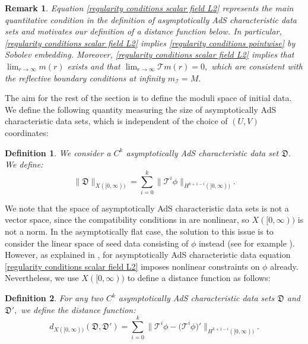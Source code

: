 \documentclass[11pt]{article}
\newtheorem{definition}{Definition}[section]
\newtheorem{remark}{Remark}[section]
\numberwithin{equation}{section}
\begin{document}
\begin{remark}
    Equation \eqref{regularity conditions scalar field L2} represents the main quantitative condition in the definition of asymptotically AdS characteristic data sets and motivates our definition of a distance function below. In particular, \eqref{regularity conditions scalar field L2} implies \eqref{regularity conditions pointwise} by Sobolev embedding. Moreover, \eqref{regularity conditions scalar field L2} implies that $\lim_{r\rightarrow\infty}m(r)$ exists and that $\lim_{r\rightarrow\infty}\mathcal{T}m(r)=0,$ which are consistent with the reflective boundary conditions at infinity $m_{\mathcal{I}}=M.$
\end{remark}

The aim for the rest of the section is to define the moduli space of initial data. We define the following quantity measuring the size of asymptotically AdS characteristic data sets, which is independent of the choice of $(U,V)$ coordinates:
\begin{definition}
    We consider a $C^k$ asymptotically AdS characteristic data set $\mathfrak{D}$. We define:
    \begin{equation}\label{norm definition}
        \big\|\mathfrak{D}\big\|_{X([0,\infty))}=\sum_{i=0}^k\big\|\mathcal{T}^i\phi\big\|_{H^{k+1-i}([0,\infty))}.
    \end{equation}
\end{definition}

We note that the space of asymptotically AdS characteristic data sets is not a vector space, since the compatibility conditions in  are nonlinear, so $X([0,\infty))$ is not a norm. In the asymptotically flat case, the solution to this issue is to consider the linear space of seed data consisting of $\phi$ instead (see for example \cite{ChrWCC}). However, as explained in , for asymptotically AdS characteristic data equation \eqref{regularity conditions scalar field L2} imposes nonlinear constraints on $\phi$ already. Nevertheless, we use $X([0,\infty))$ to define a distance function as follows:

\begin{definition}
    For any two $C^k$ asymptotically AdS characteristic data sets $\mathfrak{D}$ and $\mathfrak{D}',$ we define the distance function:
    \begin{equation}\label{distance function definition}
        d_{X([0,\infty))}(\mathfrak{D},\mathfrak{D}')=\sum_{i=0}^k\Big\|\mathcal{T}^i\phi-\big(\mathcal{T}^i\phi\big)'\Big\|_{H^{k+1-i}([0,\infty))}.
    \end{equation}
\end{definition}
\end{document}
